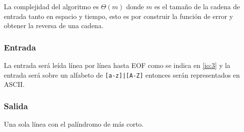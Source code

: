 La complejidad del algoritmo es $\Theta(m)$ donde $m$ es el tamaño de la cadena de entrada tanto
en espacio y tiempo, esto es por construir la función de error y obtener la reversa de una cadena.

\subsubsection{Entrada}
La entrada será leída línea por línea hasta EOF como se indica en \ref{io:3} y la entrada será
sobre un alfabeto de \texttt{[a-z]|[A-Z]} entonces serán representados en ASCII.

\subsubsection{Salida}
Una sola línea con el palíndromo de más corto.

